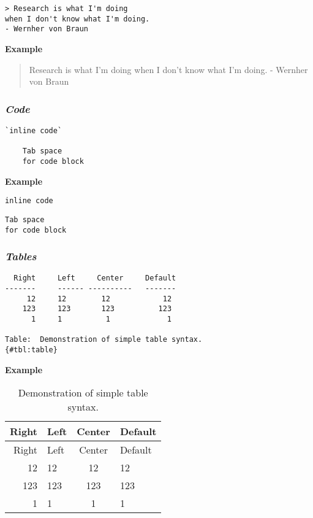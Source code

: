 \documentclass[journal,]{IEEEtran}
\begin{document}
\begin{verbatim}
> Research is what I'm doing
when I don't know what I'm doing.
- Wernher von Braun
\end{verbatim}

\textbf{Example}

\begin{quote}
Research is what I'm doing when I don't know what I'm doing. - Wernher
von Braun
\end{quote}

\hypertarget{code}{%
\subsubsection{\texorpdfstring{\textbf{\emph{Code}}}{Code}}\label{code}}

\begin{verbatim}
`inline code`

    Tab space
    for code block
\end{verbatim}

\textbf{Example}

\texttt{inline\ code}

\begin{verbatim}
Tab space
for code block
\end{verbatim}

\hypertarget{tables}{%
\subsubsection{\texorpdfstring{\textbf{\emph{Tables}}}{Tables}}\label{tables}}

\begin{verbatim}
  Right     Left     Center     Default
-------     ------ ----------   -------
     12     12        12            12
    123     123       123          123
      1     1          1             1

Table:  Demonstration of simple table syntax.
{#tbl:table}
\end{verbatim}

\textbf{Example}

\begin{longtable}[]{@{}rlcl@{}}
\caption{Demonstration of simple table syntax.
\label{tbl:table}}\tabularnewline
\toprule
Right & Left & Center & Default\tabularnewline
\midrule
\endfirsthead
\toprule
Right & Left & Center & Default\tabularnewline
\midrule
\endhead
12 & 12 & 12 & 12\tabularnewline
123 & 123 & 123 & 123\tabularnewline
1 & 1 & 1 & 1\tabularnewline
\bottomrule
\end{longtable}
\end{document}

